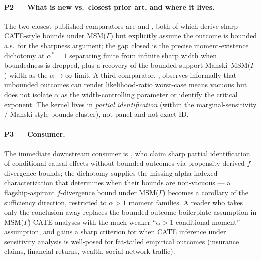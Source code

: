 \documentclass[11pt]{article}
\theoremstyle{definition}
\theoremstyle{plain}
\theoremstyle{remark}
\begin{document}
\paragraph{P2 --- What is new vs.\ closest prior art, and where it lives.}
The two closest published comparators are \citet[Theorem~1, eqn.\ (4)]{KallusMaoZhou2019CATEIntervals} and \citet[Theorem~3.1]{YadlowskyNamkoongBasuDuchiTian2022Bounds}, both of which derive sharp CATE-style bounds under MSM($\Gamma$) but explicitly assume the outcome is bounded a.s.\ for the sharpness argument; the gap closed is the precise moment-existence dichotomy at $\alpha^{*}=1$ separating finite from infinite sharp width when boundedness is dropped, plus a recovery of the bounded-support Manski--MSM($\Gamma$) width as the $\alpha\to\infty$ limit. A third comparator, \citet[\S 5 ``Outcome-shift vacuity'']{AsiaeePalBeckHuling2026SharpGeneralization}, observes informally that unbounded outcomes can render likelihood-ratio worst-case means vacuous but does not isolate $\alpha$ as the width-controlling parameter or identify the critical exponent. The kernel lives in \emph{partial identification} (within the marginal-sensitivity / Manski-style bounds cluster), not panel and not exact-ID.

\paragraph{P3 --- Consumer.}
The immediate downstream consumer is \citet{JungKang2026ITBounds}, who claim sharp partial identification of conditional causal effects without bounded outcomes via propensity-derived $f$-divergence bounds; the dichotomy supplies the missing alpha-indexed characterization that determines when their bounds are non-vacuous --- a flagship-aspirant $f$-divergence bound under MSM($\Gamma$) becomes a corollary of the sufficiency direction, restricted to $\alpha>1$ moment families. A reader who takes only the conclusion away replaces the bounded-outcome boilerplate assumption in MSM($\Gamma$) CATE analyses with the much weaker ``$\alpha>1$ conditional moment'' assumption, and gains a sharp criterion for when CATE inference under sensitivity analysis is well-posed for fat-tailed empirical outcomes (insurance claims, financial returns, wealth, social-network traffic).
\end{document}
